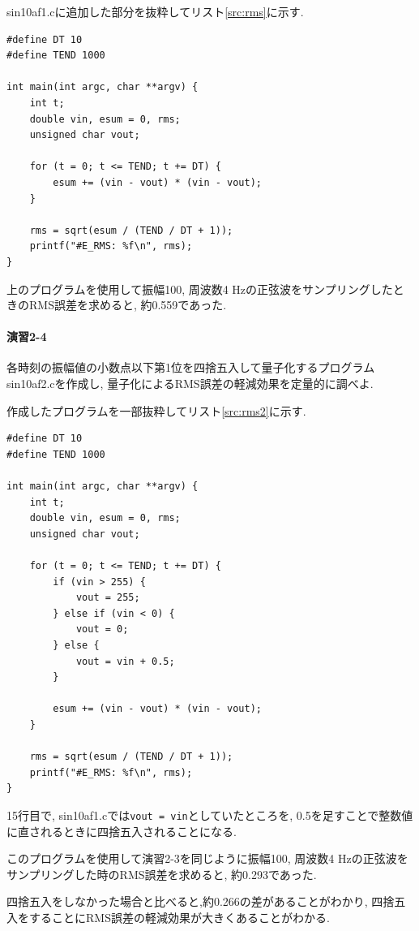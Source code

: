 \documentclass[titlepage]{jsarticle}
\begin{document}
        sin10af1.cに追加した部分を抜粋してリスト\ref{src:rms}に示す.
        

        \begin{lstlisting}[caption=sin10af1.c, label=src:rms]
#define DT 10
#define TEND 1000

int main(int argc, char **argv) {
    int t;
    double vin, esum = 0, rms;
    unsigned char vout;

    for (t = 0; t <= TEND; t += DT) {
        esum += (vin - vout) * (vin - vout);
    }

    rms = sqrt(esum / (TEND / DT + 1));
    printf("#E_RMS: %f\n", rms);
}\end{lstlisting}

        上のプログラムを使用して振幅100, 周波数4 Hzの正弦波をサンプリングしたときのRMS誤差を求めると,
        約0.559であった.

    \paragraph{演習2-4} 各時刻の振幅値の小数点以下第1位を四捨五入して量子化するプログラムsin10af2.cを作成し,
    量子化によるRMS誤差の軽減効果を定量的に調べよ.

        作成したプログラムを一部抜粋してリスト\ref{src:rms2}に示す.

        \begin{lstlisting}[caption=sin10af2.c, label=src:rms2]
#define DT 10
#define TEND 1000

int main(int argc, char **argv) {
    int t;
    double vin, esum = 0, rms;
    unsigned char vout;

    for (t = 0; t <= TEND; t += DT) {
        if (vin > 255) {
            vout = 255;
        } else if (vin < 0) {
            vout = 0;
        } else {
            vout = vin + 0.5;
        }

        esum += (vin - vout) * (vin - vout);
    }

    rms = sqrt(esum / (TEND / DT + 1));
    printf("#E_RMS: %f\n", rms);
}\end{lstlisting}

        15行目で, sin10af1.cでは\verb|vout = vin|としていたところを,
        0.5を足すことで整数値に直されるときに四捨五入されることになる.

        このプログラムを使用して演習2-3を同じように振幅100, 周波数4 Hzの正弦波をサンプリングした時のRMS誤差を求めると,
        約0.293であった.

        四捨五入をしなかった場合と比べると,約0.266の差があることがわかり,
        四捨五入をすることにRMS誤差の軽減効果が大きくあることがわかる.
\end{document}

